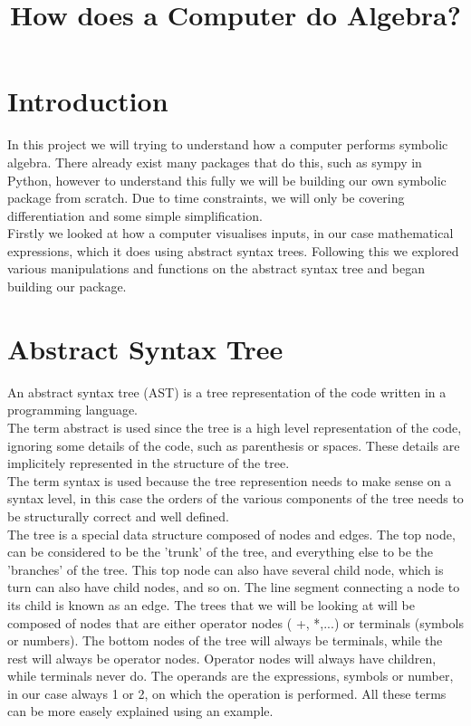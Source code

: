\documentclass[12pt]{article}
\author{}
\title{\textbf{How does a Computer do Algebra?}}
\date{}
\newcommand\blankpage{
    \null
    \thispagestyle{empty}
    \newpage
    }
\begin{document}
\afterpage{\blankpage}

\maketitle
\newpage

\afterpage{\blankpage}
\tableofcontents



\newpage




\section{Introduction}
In this project we will trying to understand how a computer performs symbolic algebra. There already exist many packages that do this, such as sympy in Python, however to understand this fully we will be building our own symbolic package from scratch. Due to time constraints, we will only be covering differentiation and some simple simplification.\\
Firstly we looked at how a computer visualises inputs, in our case mathematical expressions, which it does using abstract syntax trees. Following this we explored various manipulations and functions on the abstract syntax tree and began building our package.

\section{Abstract Syntax Tree}
An abstract syntax tree (AST) is a tree representation of the code written in a programming language.\\
The term abstract is used since the tree is a high level representation of the code, ignoring some details of the code, such as parenthesis or spaces. These details are implicitely represented in the structure of the tree.\\
The term syntax is used because the tree represention needs to make sense on a syntax level, in this case the orders of the various components of the tree needs to be structurally correct and well defined.\\
The tree is a special data structure composed of nodes and edges. The top node, can be considered to be the 'trunk' of the tree, and everything else to be the 'branches' of the tree. This top node can also have several child node, which is turn can also have child nodes, and so on. The line segment connecting a node to its child is known as an edge. The trees that we will be looking at will be composed of nodes that are either operator nodes ( +, *,...) or terminals (symbols or numbers). The bottom nodes of the tree will always be terminals, while the rest will always be operator nodes. Operator nodes will always have children, while terminals never do. The operands are the expressions, symbols or number, in our case always 1 or 2, on which the operation is performed. All these terms can be more easely explained using an example.\\
\end{document}
